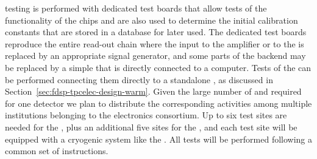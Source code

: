  testing is performed with dedicated test boards that
allow tests of the functionality of the chips and are also used
to determine the initial calibration constants that are stored in
a database for later used. The dedicated test boards reproduce the
entire read-out chain where the input to the  amplifier
or to the  is replaced by an appropriate signal generator,
and some parts of the backend may be replaced by a simple 
that is directly connected to a computer. Tests of the 
can be performed connecting them directly to a standalone ,
as discussed in Section~\ref{sec:fdsp-tpcelec-design-warm}. Given
the large number of  and  required for
one   detector we plan to distribute the 
corresponding  activities among multiple institutions
belonging to the  electronics consortium. Up to six
test sites are needed for the , plus an additional
five sites for the , and each test site will be 
equipped with a cryogenic system like the . All tests
will be performed following a common set of instructions.

